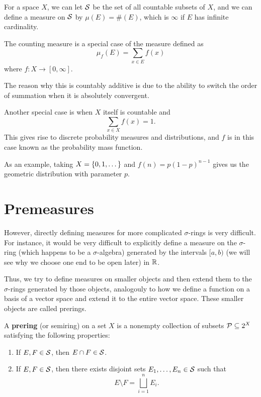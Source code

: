 \begin{example}
    For a space $X$, we can let $\mathcal S$ be the set of all countable subsets of $X$, and we can define a measure on $\mathcal S$ by $\mu(E) = \#(E)$, which is $\infty$ if $E$ has infinite cardinality.
\end{example}

\begin{example}
    The counting measure is a special case of the measure defined as \[\mu_f(E) = \sum_{x \in E} f(x) \]where $f \colon X \to [0, \infty]$.

    The reason why this is countably additive is due to the ability to switch the order of summation when it is absolutely convergent.
\end{example}

\begin{example}
    Another special case is when $X$ itself is countable and \[ \sum_{x \in X} f(x) = 1.\] This gives rise to discrete probability measures and distributions, and $f$ is in this case known as the probability mass function. 

    As an example, taking $X = \qty{0, 1, \dots}$ and $f(n) = p(1 - p)^{n - 1}$ gives us the geometric distribution with parameter $p$.
\end{example}

\section{Premeasures}

However, directly defining measures for more complicated $\sigma$-rings is very difficult. For instance, it would be very difficult to explicitly define a measure on the $\sigma$-ring (which happens to be a $\sigma$-algebra) generated by the intervals $[a, b)$ (we will see why we choose one end to be open later) in $\mathbb R$.

Thus, we try to define measures on smaller objects and then extend them to the $\sigma$-rings generated by those objects, analogouly to how we define a function on a basis of a vector space and extend it to the entire vector space. These smaller objects are called prerings.

\begin{definition}
    A \textbf{prering} (or semiring) on a set $X$ is a nonempty collection of subsets $\mathcal P \subseteq 2^X$ satisfying the following properties:
    \begin{enumerate}
        \item If $E, F \in \mathcal S$, then $E \cap F \in \mathcal S$.
        \item If $E, F \in \mathcal S$, then there exists disjoint sets $E_1, \dots, E_n \in \mathcal S$ such that \[E \setminus F = \bigsqcup_{i = 1}^n E_i.\]
    \end{enumerate}
\end{definition}

